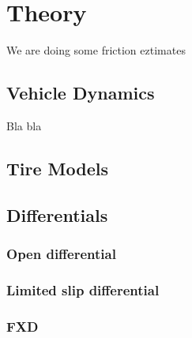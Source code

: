 \chapter{Theory}


We are doing some friction eztimates

\section{Vehicle Dynamics}

Bla bla \cite{Reference1}

\section{Tire Models}

\section{Differentials}

\subsection{Open differential}

\subsection{Limited slip differential}

\subsection{FXD}